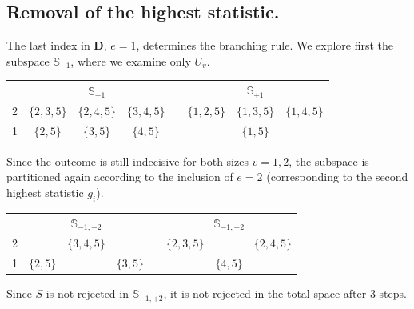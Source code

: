 \documentclass[11pt,a4paper,openright,twoside]{article}
\begin{document}
\subsection{Removal of the highest statistic.}
The last index in $\mathbf{D}$, $e=1$, determines the branching rule. We explore first the subspace $\mathbb{S}_{-1}$, where we examine only $U_v$.
\begin{table}[h!]
\centering
\begin{tabular}{c|ccccccc}
 & \multicolumn{3}{c}{$\mathbb{S}_{-1}$} & & \multicolumn{3}{c}{$\mathbb{S}_{+1}$}\\
\cline{2-4} \cline{6-8}
2 & $\{2,3,5\}$ & $\{2,4,5\}$ & $\{3,4,5\}$ & & $\{1,2,5\}$ & $\{1,3,5\}$ & $\{1,4,5\}$ \\
1 & $\{2,5\}$ & $\{3,5\}$ & $\{4,5\}$ & & & $\{1,5\}$ &  \\
\end{tabular}
\end{table}

Since the outcome is still indecisive for both sizes $v=1,2$, the subspace is partitioned again according to the inclusion of $e=2$ (corresponding to the second highest statistic $g_i$).
\begin{table}[h!]
\centering
\begin{tabular}{c|ccccccc}
 & \multicolumn{3}{c}{$\mathbb{S}_{-1,-2}$} & & \multicolumn{3}{c}{$\mathbb{S}_{-1,+2}$}\\
\cline{2-4} \cline{6-8}
2 &  & $\{3,4,5\}$ &  & & $\{2,3,5\}$ &  & $\{2,4,5\}$ \\
1 & $\{2,5\}$ &  & $\{3,5\}$ &  &  & $\{4,5\}$ &  \\
\end{tabular}
\end{table}

Since $S$ is not rejected in $\mathbb{S}_{-1,+2}$, it is not rejected in the total space after 3 steps.

\vspace{10mm}
\end{document}
